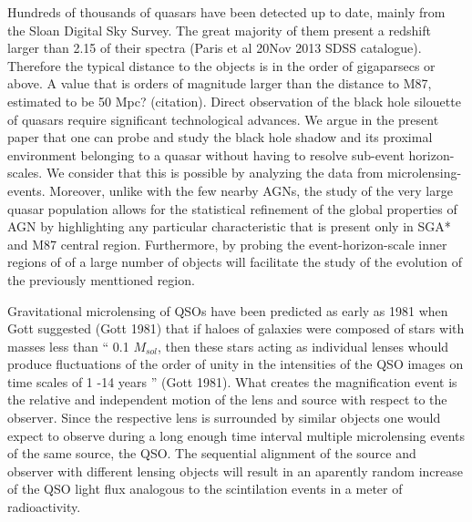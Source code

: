Hundreds of thousands of quasars have been detected up to date, mainly from the Sloan Digital Sky Survey. The great majority of them present a redshift larger than 2.15 of their spectra (Paris et al 20Nov 2013 SDSS catalogue). Therefore the typical distance to the objects is in the order of gigaparsecs or above. A value that is orders of magnitude 
larger than the distance to M87, estimated to be 50 Mpc? (citation). Direct observation of the black hole silouette of quasars require significant technological advances. We argue in the present paper
 that one can probe and study the black hole shadow and its proximal environment belonging to a quasar without having to resolve sub-event horizon-scales. We consider that this is possible by analyzing the data from microlensing-events.  Moreover, unlike with the few nearby AGNs, the study of the very large quasar population allows for the statistical refinement of the global properties of AGN by highlighting any particular
characteristic that is present only in SGA* and M87 central region. Furthermore, by probing the event-horizon-scale inner regions of of a large number of objects will facilitate the study of the evolution of the previously menttioned region.     
     
Gravitational microlensing of QSOs have been predicted as early as 1981 when Gott suggested (Gott 1981) that if haloes of galaxies were composed of stars with masses less than `` 0.1 $M_{sol}$, then these stars acting as individual lenses whould produce fluctuations of the order of 
unity in the intensities of the QSO images on time scales of 1 -14 years '' (Gott 1981). What creates the magnification event is the relative and independent motion of the lens and source with respect to the observer. Since the respective lens is surrounded by similar objects one would expect to observe during a long enough time interval
multiple microlensing events of the same source, the QSO. The sequential alignment of the source and observer with different lensing objects will result in an aparently random increase of the QSO light flux analogous to the scintilation events in a meter of radioactivity.

